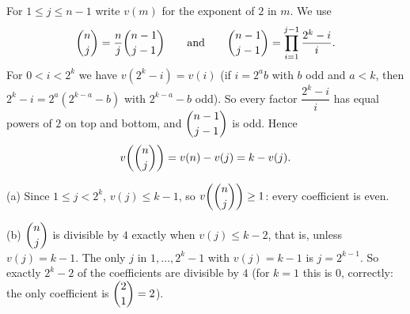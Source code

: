 For $1\le j\le n-1$ write $v(m)$ for the exponent of $2$ in $m$. We use
\[\dbinom{n}{j}=\dfrac{n}{j}\dbinom{n-1}{j-1}\qquad\text{and}\qquad \dbinom{n-1}{j-1}=\prod_{i=1}^{j-1}\dfrac{2^k-i}{i}.\]
For $0<i<2^k$ we have $v(2^k-i)=v(i)$ (if $i=2^ab$ with $b$ odd and $a<k$, then $2^k-i=2^a(2^{k-a}-b)$ with $2^{k-a}-b$ odd). So every factor $\dfrac{2^k-i}{i}$ has equal powers of $2$ on top and bottom, and $\dbinom{n-1}{j-1}$ is odd. Hence
\[v\!\left(\dbinom nj\right)=v(n)-v(j)=k-v(j).\]

(a) Since $1\le j<2^k$, $v(j)\le k-1$, so $v\!\left(\dbinom nj\right)\ge1$: every coefficient is even.

(b) $\dbinom nj$ is divisible by $4$ exactly when $v(j)\le k-2$, that is, unless $v(j)=k-1$. The only $j$ in $1,\dots,2^k-1$ with $v(j)=k-1$ is $j=2^{k-1}$. So exactly $\boxed{2^k-2}$ of the coefficients are divisible by $4$ (for $k=1$ this is $0$, correctly: the only coefficient is $\dbinom21=2$).
